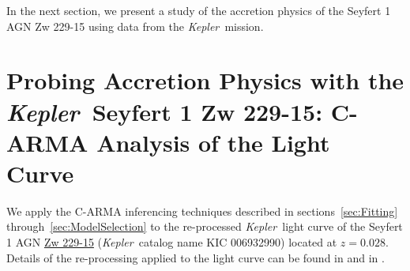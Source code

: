 \documentclass[a4paper,fleqn,usenatbib]{mnras}
\newcommand{\Kepler}{\textit{Kepler~}}
\begin{document}
In the next section, we present a study of the accretion physics of the Seyfert 1 AGN Zw 229-15 using data from the \Kepler mission.

\section[C-ARMA Analysis of Zw 229-15]{Probing Accretion Physics with the \Kepler Seyfert 1 Zw 229-15: C-ARMA Analysis of the Light Curve}\label{sec:Zw229-15}

We apply the C-ARMA inferencing techniques described in sections~\ref{sec:Fitting} through~\ref{sec:ModelSelection} to the re-processed \Kepler light curve of the Seyfert 1 AGN \href{http://ned.ipac.caltech.edu/cgi-bin/objsearch?objname=Zw+229-15&extend=no&hconst=73&omegam=0.27&omegav=0.73&corr_z=1&out_csys=Equatorial&out_equinox=J2000.0&obj_sort=RA+or+Longitude&of=pre_text&zv_breaker=30000.0&list_limit=5&img_stamp=YES}{Zw 229-15} (\Kepler catalog name KIC 006932990) located at $z = 0.028$. Details of the re-processing applied to the light curve can be found in \citep{CariniWilliamsAAS} and in \citet{Kasliwal15b}.



\end{document}
